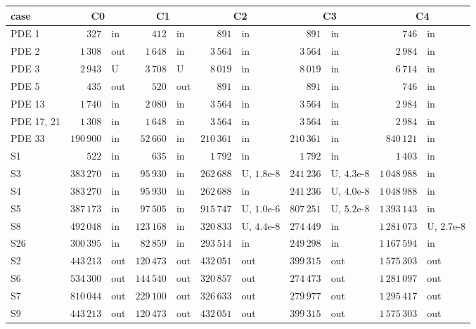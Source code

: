 \begin{table}[h]\centering\scriptsize
\setlength{\tabcolsep}{4pt}
\begin{tabular}{lrlrlrlrlrl}
\toprule
case & \multicolumn{2}{c}{C0} & \multicolumn{2}{c}{C1} & \multicolumn{2}{c}{C2} & \multicolumn{2}{c}{C3} & \multicolumn{2}{c}{C4} \\
\midrule
PDE 1 & $327$ & in & $412$ & in & $891$ & in & $891$ & in & $746$ & in \\
PDE 2 & $1\,308$ & out & $1\,648$ & in & $3\,564$ & in & $3\,564$ & in & $2\,984$ & in \\
PDE 3 & $2\,943$ & U & $3\,708$ & U & $8\,019$ & in & $8\,019$ & in & $6\,714$ & in \\
PDE 5 & $435$ & out & $520$ & out & $891$ & in & $891$ & in & $746$ & in \\
PDE 13 & $1\,740$ & in & $2\,080$ & in & $3\,564$ & in & $3\,564$ & in & $2\,984$ & in \\
PDE 17, 21 & $1\,308$ & in & $1\,648$ & in & $3\,564$ & in & $3\,564$ & in & $2\,984$ & in \\
\midrule
PDE 33 & $190\,900$ & in & $52\,660$ & in & $210\,361$ & in & $210\,361$ & in & $840\,121$ & in \\
\midrule
S1 & $522$ & in & $635$ & in & $1\,792$ & in & $1\,792$ & in & $1\,403$ & in \\
S3 & $383\,270$ & in & $95\,930$ & in & $262\,688$ & U, $1.8$e-8 & $241\,236$ & U, $4.3$e-8 & $1\,048\,988$ & in \\
S4 & $383\,270$ & in & $95\,930$ & in & $262\,688$ & in & $241\,236$ & U, $4.0$e-8 & $1\,048\,988$ & in \\
S5 & $387\,173$ & in & $97\,505$ & in & $915\,747$ & U, $1.0$e-6 & $807\,251$ & U, $5.2$e-8 & $1\,393\,143$ & in \\
S8 & $492\,048$ & in & $123\,168$ & in & $320\,833$ & U, $4.4$e-8 & $274\,449$ & in & $1\,281\,073$ & U, $2.7$e-8 \\
S26 & $300\,395$ & in & $82\,859$ & in & $293\,514$ & in & $249\,298$ & in & $1\,167\,594$ & in \\
S2 & $443\,213$ & out & $120\,473$ & out & $432\,051$ & out & $399\,315$ & out & $1\,575\,303$ & out \\
S6 & $534\,300$ & out & $144\,540$ & out & $320\,857$ & out & $274\,473$ & out & $1\,281\,097$ & out \\
S7 & $810\,044$ & out & $229\,100$ & out & $326\,633$ & out & $279\,977$ & out & $1\,295\,417$ & out \\
S9 & $443\,213$ & out & $120\,473$ & out & $432\,051$ & out & $399\,315$ & out & $1\,575\,303$ & out \\

\end{tabular}
\end{table}
